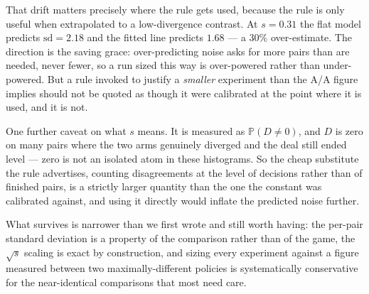 \documentclass[11pt,a4paper]{article}
\newcommand{\Prob}{\ensuremath{\mathbb{P}}}
\begin{document}
That drift matters precisely where the rule gets used, because the rule is only
useful when extrapolated to a low-divergence contrast. At $s = 0.31$ the flat
model predicts $\mathrm{sd} = 2.18$ and the fitted line predicts $1.68$ --- a
$30\%$ over-estimate. The direction is the saving grace: over-predicting noise
asks for more pairs than are needed, never fewer, so a run sized this way is
over-powered rather than under-powered. But a rule invoked to justify a
\emph{smaller} experiment than the A/A figure implies should not be quoted as
though it were calibrated at the point where it is used, and it is not.

One further caveat on what $s$ means. It is measured as $\Prob(D \neq 0)$, and
$D$ is zero on many pairs where the two arms genuinely diverged and the deal
still ended level --- zero is not an isolated atom in these histograms. So the
cheap substitute the rule advertises, counting disagreements at the level of
decisions rather than of finished pairs, is a strictly larger quantity than the
one the constant was calibrated against, and using it directly would inflate the
predicted noise further.

What survives is narrower than we first wrote and still worth having: the
per-pair standard deviation is a property of the comparison rather than of the
game, the $\sqrt{s}$ scaling is exact by construction, and sizing every
experiment against a figure measured between two maximally-different policies is
systematically conservative for the near-identical comparisons that most need
care.

\label{sec:eval-sd}
\end{document}
